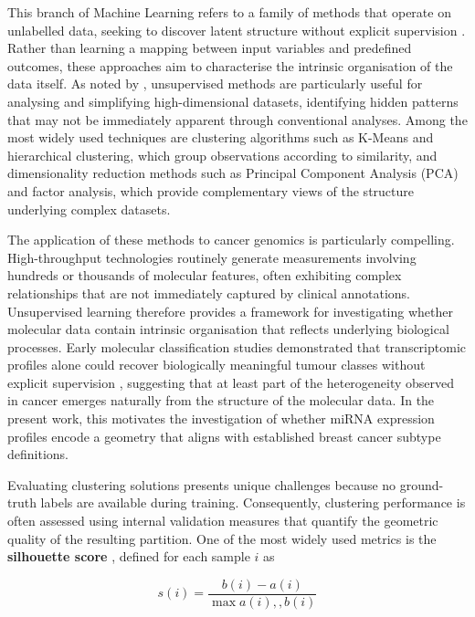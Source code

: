 This branch of Machine Learning refers to a family of methods that operate on unlabelled data, seeking to discover latent structure without explicit supervision \cite{hastie2009elements}. Rather than learning a mapping between input variables and predefined outcomes, these approaches aim to characterise the intrinsic organisation of the data itself. As noted by \citeauthor{https://doi.org/10.1007/s00167-022-07233-7} \cite{https://doi.org/10.1007/s00167-022-07233-7}, unsupervised methods are particularly useful for analysing and simplifying high-dimensional datasets, identifying hidden patterns that may not be immediately apparent through conventional analyses. Among the most widely used techniques are clustering algorithms such as K-Means and hierarchical clustering, which group observations according to similarity, and dimensionality reduction methods such as Principal Component Analysis (PCA) and factor analysis, which provide complementary views of the structure underlying complex datasets.

The application of these methods to cancer genomics is particularly compelling. High-throughput technologies routinely generate measurements involving hundreds or thousands of molecular features, often exhibiting complex relationships that are not immediately captured by clinical annotations. Unsupervised learning therefore provides a framework for investigating whether molecular data contain intrinsic organisation that reflects underlying biological processes. Early molecular classification studies demonstrated that transcriptomic profiles alone could recover biologically meaningful tumour classes without explicit supervision \cite{bc_molecular_Perou2000}, suggesting that at least part of the heterogeneity observed in cancer emerges naturally from the structure of the molecular data. In the present work, this motivates the investigation of whether miRNA expression profiles encode a geometry that aligns with established breast cancer subtype definitions.

Evaluating clustering solutions presents unique challenges because no ground-truth labels are available during training. Consequently, clustering performance is often assessed using internal validation measures that quantify the geometric quality of the resulting partition. One of the most widely used metrics is the \textbf{silhouette score} \cite{rousseeuw1987silhouettes}, defined for each sample $i$ as

\begin{equation}
s(i) = \frac{b(i) - a(i)}{\max{a(i),, b(i)}}
\label{eq:silhouette}
\end{equation}

